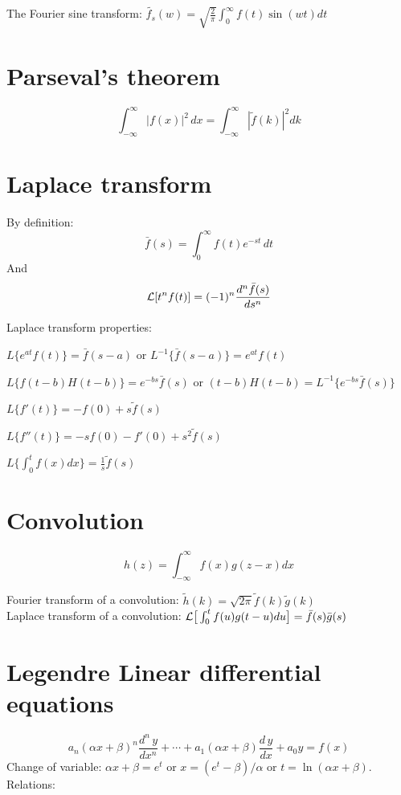 \documentclass[12pt,twoside]{article}
\begin{document}
The Fourier sine transform: $ \tilde{f_s}(w) = \sqrt{\frac{2}{\pi}} \int_0^\infty f(t) \sin(w t) dt$

\section{Parseval's theorem}

\[
	\int_{-\infty}^{\infty} |f(x)|^2 \, dx = \int_{-\infty}^{\infty} |\tilde{f}(k)|^2 dk 
\]

\section{Laplace transform}
By definition:
\[
	\bar{f}(s) = \int_{0}^{\infty} f(t) e^{-st} \, dt
\]
And
\[
	\ml{L} [t^n f(t)] = (-1)^n \frac{d^n \bar{f}(s)} {ds^n} %
\]

Laplace transform properties:
\bi
	\item $L \{ e^{a t} f(t)  \} = \bar{f} (s-a)$ or $L^{-1} \{ \bar{f} (s-a)\} = e^{a t} f(t) $
	\item  $L \{ f(t-b) H(t-b) \} = e^{-b s} \bar{f} (s)$ or $(t-b) H(t-b) = L^{-1}\{e^{-bs} \bar{f}(s)\}$
	\item $L\{f'(t)\} = -f(0) + s \tilde{f}(s)$
	\item $L\{f''(t)\} = -s f(0) -f'(0) + s^2 \tilde{f}(s)$
	\item $L\{ \int_0^t f(x) dx \} = \frac{1}{s} \tilde{f}(s)$
\ei

\section{Convolution}

\[
	h(z) = \int_{-\infty}^{\infty} f(x) g(z-x) dx
\]

Fourier transform of a convolution: $\tilde{h}(k) = \sqrt{2\pi} \tilde{f}(k) \tilde{g}(k)$\\
Laplace transform of a convolution: $\mathcal{ L }\big[\int_0^t f(u) g(t-u) du \big] = \bar{f}(s) \bar{g}(s)$

\section{Legendre Linear differential equations}

\[
	a_n (\alpha x + \beta)^n \frac{d^n \, y}{dx^n} + \cdots + a_1 (\alpha x + \beta) \frac{d \, y}{dx} + a_0 y = f(x)
\]
Change of variable: $\alpha x + \beta = e^t$ or $x=(e^t - \beta) / \alpha$ or $t=\ln(\alpha x + \beta)$.
Relations:
\end{document}
